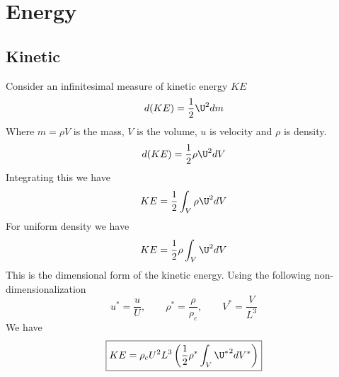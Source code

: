 \documentclass[11pt]{article}
\begin{document}
\doublespacing
\MOONSTITLE
\maketitle

\section{Energy}

\subsection{Kinetic}
Consider an infinitesimal measure of kinetic energy $KE$
\begin{equation}
	d(KE) = \frac{1}{2} \U^2 dm
\end{equation}
Where $m=\rho V$ is the mass, $V$ is the volume, $u$ is velocity and $\rho$ is density.
\begin{equation}
	d(KE) = \frac{1}{2} \rho \U^2 dV
\end{equation}
Integrating this we have
\begin{equation}
	KE = \frac{1}{2} \int_V \rho \U^2 dV
\end{equation}
For uniform density we have
\begin{equation}
	KE = \frac{1}{2} \rho \int_V \U^2 dV
\end{equation}
This is the dimensional form of the kinetic energy. Using the following non-dimensionalization
\begin{equation}
	u^* = \frac{u}{U},
	\qquad
	\rho^* = \frac{\rho}{\rho_c},
	\qquad
	V^* = \frac{V}{L^3}
\end{equation}
We have
\begin{equation}
	\boxed{
	KE = \rho_c U^2 L^3 \left( \frac{1}{2} \rho^* \int_V {\U^*}^2 dV^* \right)
	}
\end{equation}
\end{document}
